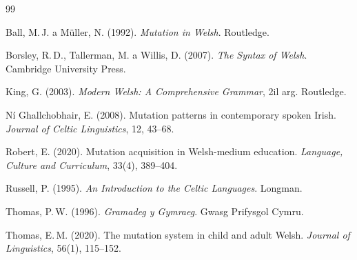 \documentclass[12pt,a4paper]{article}
\begin{document}
\begin{thebibliography}{99}

Ball, M.\,J. a M\"uller, N. (1992).
\emph{Mutation in Welsh}.
Routledge.

Borsley, R.\,D., Tallerman, M. a Willis, D. (2007).
\emph{The Syntax of Welsh}.
Cambridge University Press.

King, G. (2003).
\emph{Modern Welsh: A Comprehensive Grammar}, 2il arg.
Routledge.

N\'{i} Ghallchobhair, E. (2008).
Mutation patterns in contemporary spoken Irish.
\emph{Journal of Celtic Linguistics}, 12, 43--68.

Robert, E. (2020).
Mutation acquisition in Welsh-medium education.
\emph{Language, Culture and Curriculum}, 33(4), 389--404.

Russell, P. (1995).
\emph{An Introduction to the Celtic Languages}.
Longman.

Thomas, P.\,W. (1996).
\emph{Gramadeg y Gymraeg}.
Gwasg Prifysgol Cymru.

Thomas, E.\,M. (2020).
The mutation system in child and adult Welsh.
\emph{Journal of Linguistics}, 56(1), 115--152.

\end{thebibliography}
\end{document}
